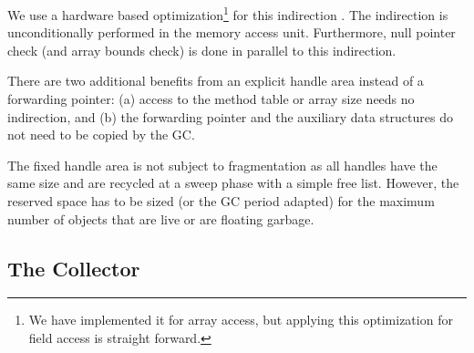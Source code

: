 We use a hardware based optimization\footnote{We have implemented it
for array access, but applying this optimization for field access is
straight forward.} for this indirection \cite{jop:oohw:jtres2007}.
The indirection is unconditionally performed in the memory access
unit. Furthermore, null pointer check (and array bounds check) is
done in parallel to this indirection.

There are two additional benefits from an explicit handle area instead of a
forwarding pointer: (a) access to the method table or array size needs no
indirection, and (b) the forwarding pointer and the auxiliary data
structures do not need to be copied by the GC.

The fixed handle area is not subject to fragmentation as all handles
have the same size and are recycled at a sweep phase with a simple
free list. However, the reserved space has to be sized (or the GC
period adapted) for the maximum number of objects that are live or
are floating garbage.


\subsection{The Collector}

